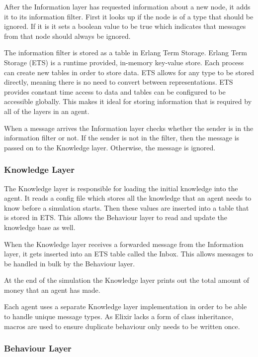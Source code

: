 After the Information layer has requested information about a new node, it adds it to its information filter.
First it looks up if the node is of a type that should be ignored.
If it is it sets a boolean value to be true which indicates that messages from that node should always be ignored.

The information filter is stored as a table in Erlang Term Storage.
Erlang Term Storage (ETS) is a runtime provided, in-memory key-value store.
Each process can create new tables in order to store data.
ETS allows for any type to be stored directly, meaning there is no need to convert between representations.
ETS provides constant time access to data and tables can be configured to be accessible globally.
This makes it ideal for storing information that is required by all of the layers in an agent.

When a message arrives the Information layer checks whether the sender is in the information filter or not.
If the sender is not in the filter, then the message is passed on to the Knowledge layer.
Otherwise, the message is ignored.

\subsubsection{Knowledge Layer}

The Knowledge layer is responsible for loading the initial knowledge into the agent.
It reads a config file which stores all the knowledge that an agent needs to know before a simulation starts.
Then these values are inserted into a table that is stored in ETS\@.
This allows the Behaviour layer to read and update the knowledge base as well.

When the Knowledge layer receives a forwarded message from the Information layer, it gets inserted into an ETS table called the Inbox.
This allows messages to be handled in bulk by the Behaviour layer.

At the end of the simulation the Knowledge layer prints out the total amount of money that an agent has made.

Each agent uses a separate Knowledge layer implementation in order to be able to handle unique message types.
As Elixir lacks a form of class inheritance, macros are used to ensure duplicate behaviour only needs to be written once.

\subsubsection{Behaviour Layer}

